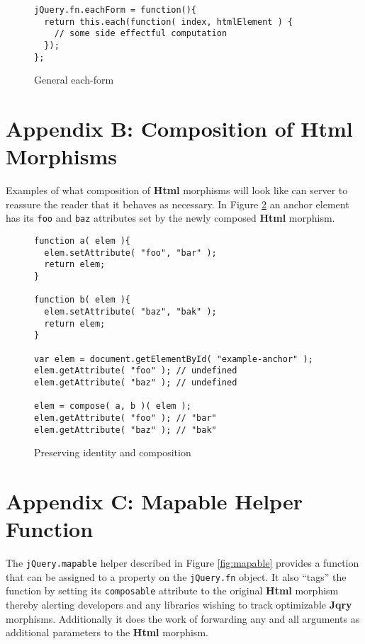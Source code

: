\documentclass[preprint, leqno]{sigplanconf}
\begin{document}
\begin{figure}[!ht]
\small
\begin{verbatim}
jQuery.fn.eachForm = function(){
  return this.each(function( index, htmlElement ) {
    // some side effectful computation
  });
};
\end{verbatim}
\nocaptionrule \caption{General each-form}
\label{fig:each-form}
\end{figure}

\section{Appendix B: Composition of Html Morphisms}

Examples of what composition of \textbf{Html} morphisms will look like can server to reassure the reader that it behaves as necessary. In Figure \ref{fig:html-compose} an anchor element has its \verb|foo| and \verb|baz| attributes set by the newly composed \textbf{Html} morphism.

\begin{figure}[!ht]
\small
\begin{verbatim}
function a( elem ){
  elem.setAttribute( "foo", "bar" );
  return elem;
}

function b( elem ){
  elem.setAttribute( "baz", "bak" );
  return elem;
}

var elem = document.getElementById( "example-anchor" );
elem.getAttribute( "foo" ); // undefined
elem.getAttribute( "baz" ); // undefined

elem = compose( a, b )( elem );
elem.getAttribute( "foo" ); // "bar"
elem.getAttribute( "baz" ); // "bak"
\end{verbatim}
\nocaptionrule \caption{Preserving identity and composition}
\label{fig:html-compose}
\end{figure}

\section{Appendix C: Mapable Helper Function}

The \verb|jQuery.mapable| helper described in Figure \ref{fig:mapable} provides a function that can be assigned to a property on the \verb|jQuery.fn| object. It also ``tags'' the function by setting its \verb|composable| attribute to the original \textbf{Html} morphism thereby alerting developers and any libraries wishing to track optimizable \textbf{Jqry} morphisms. Additionally it does the work of forwarding any and all arguments as additional parameters to the \textbf{Html} morphism.
\end{document}
